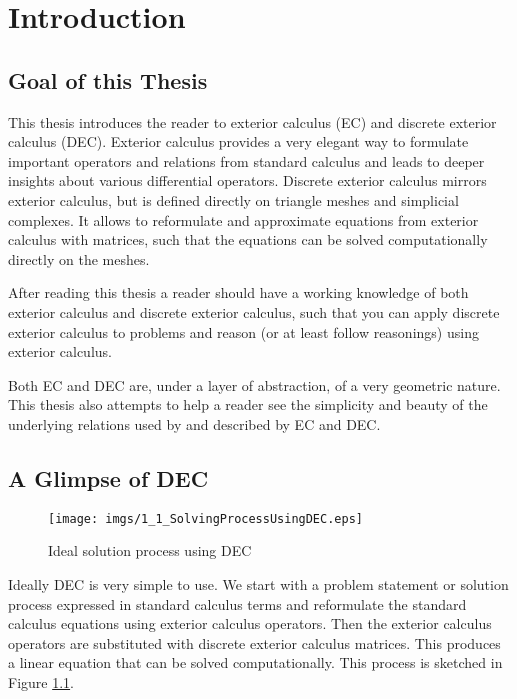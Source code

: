 \chapter{Introduction}
	
	\section{Goal of this Thesis}
	
	This thesis introduces the reader to exterior calculus (EC) and discrete exterior calculus (DEC). Exterior calculus provides a very elegant way to formulate important operators and relations from standard calculus and leads to deeper insights about various differential operators. Discrete exterior calculus mirrors exterior calculus, but is defined directly on triangle meshes and simplicial complexes. It allows to reformulate and approximate equations from exterior calculus with matrices, such that the equations can be solved computationally directly on the meshes. 
	
After reading this thesis a reader should have a working knowledge of both exterior calculus and discrete exterior calculus, such that you can apply discrete exterior calculus to problems and reason (or at least follow reasonings) using exterior calculus. 
	
Both EC and DEC are, under a layer of abstraction, of a very geometric nature. This thesis also attempts to help a reader see the simplicity and beauty of the underlying relations used by and described by EC and DEC.

		
\section{A Glimpse of DEC}
\label{sec:1_example}
\begin{figure}
\begin{center}
\texttt{[image: imgs/1\_1\_SolvingProcessUsingDEC.eps]}
\end{center}
\caption{Ideal solution process using DEC}
\label{fig:1_solutionprocess}
\end{figure}
	
Ideally DEC is very simple to use. We start with a problem statement or solution process expressed in standard calculus terms and reformulate the standard calculus equations using exterior calculus operators. Then the exterior calculus operators are substituted with discrete exterior calculus matrices. This produces a linear equation that can be solved computationally. This process is sketched in Figure \ref{fig:1_solutionprocess}.

